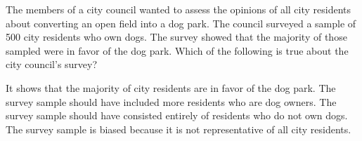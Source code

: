 \question[1]
The members of a city council wanted to assess the opinions of all city residents about converting an open field into a dog park. The council surveyed a sample of 500 city residents who own dogs. The survey showed that the majority of those sampled were in favor of the dog park. Which of the following is true about the city council's survey?
\begin{choices}
  \choice It shows that the majority of city residents are in favor of the dog park.
  \choice The survey sample should have included more residents who are dog owners.
  \choice The survey sample should have consisted entirely of residents who do not own dogs.
  \CorrectChoice The survey sample is biased because it is not representative of all city residents.
\end{choices}

